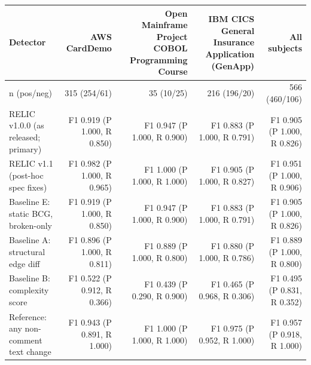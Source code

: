 \begin{tabular}{lrrrr}
\toprule
Detector & AWS CardDemo & Open Mainframe Project COBOL Programming Course & IBM CICS General Insurance Application (GenApp) & All subjects \\
\midrule
n (pos/neg) & 315 (254/61) & 35 (10/25) & 216 (196/20) & 566 (460/106) \\
RELIC v1.0.0 (as released; primary) & F1 0.919 (P 1.000, R 0.850) & F1 0.947 (P 1.000, R 0.900) & F1 0.883 (P 1.000, R 0.791) & F1 0.905 (P 1.000, R 0.826) \\
RELIC v1.1 (post-hoc spec fixes) & F1 0.982 (P 1.000, R 0.965) & F1 1.000 (P 1.000, R 1.000) & F1 0.905 (P 1.000, R 0.827) & F1 0.951 (P 1.000, R 0.906) \\
Baseline E: static BCG, broken-only & F1 0.919 (P 1.000, R 0.850) & F1 0.947 (P 1.000, R 0.900) & F1 0.883 (P 1.000, R 0.791) & F1 0.905 (P 1.000, R 0.826) \\
Baseline A: structural edge diff & F1 0.896 (P 1.000, R 0.811) & F1 0.889 (P 1.000, R 0.800) & F1 0.880 (P 1.000, R 0.786) & F1 0.889 (P 1.000, R 0.800) \\
Baseline B: complexity score & F1 0.522 (P 0.912, R 0.366) & F1 0.439 (P 0.290, R 0.900) & F1 0.465 (P 0.968, R 0.306) & F1 0.495 (P 0.831, R 0.352) \\
Reference: any non-comment text change & F1 0.943 (P 0.891, R 1.000) & F1 1.000 (P 1.000, R 1.000) & F1 0.975 (P 0.952, R 1.000) & F1 0.957 (P 0.918, R 1.000) \\
\bottomrule
\end{tabular}
